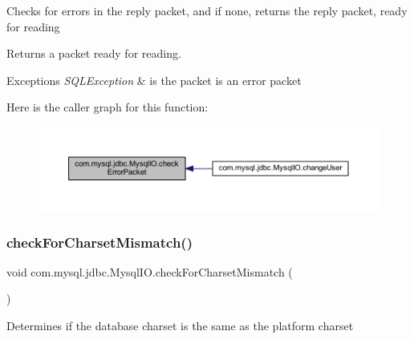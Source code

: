 Checks for errors in the reply packet, and if none, returns the reply packet, ready for reading

\begin{DoxyReturn}{Returns}
a packet ready for reading.
\end{DoxyReturn}

\begin{DoxyExceptions}{Exceptions}
{\em S\+Q\+L\+Exception} & is the packet is an error packet \\
\hline
\end{DoxyExceptions}
Here is the caller graph for this function\+:
\nopagebreak
\begin{figure}[H]
\begin{center}
\leavevmode
\includegraphics[width=350pt]{classcom_1_1mysql_1_1jdbc_1_1_mysql_i_o_aa74c577f61133d4e06188e8903e5d6c2_icgraph}
\end{center}
\end{figure}
\mbox{\label{classcom_1_1mysql_1_1jdbc_1_1_mysql_i_o_a83b397711c486862b282c060e1e7fd5f}} 
\subsubsection{\texorpdfstring{check\+For\+Charset\+Mismatch()}{checkForCharsetMismatch()}}
{\footnotesize\ttfamily void com.\+mysql.\+jdbc.\+Mysql\+I\+O.\+check\+For\+Charset\+Mismatch (\begin{DoxyParamCaption}{ }\end{DoxyParamCaption})\hspace{0.3cm}{\ttfamily [protected]}}

Determines if the database charset is the same as the platform charset \mbox{\label{classcom_1_1mysql_1_1jdbc_1_1_mysql_i_o_a86ec9e7284f797edec7e5ec4880f2006}} 
